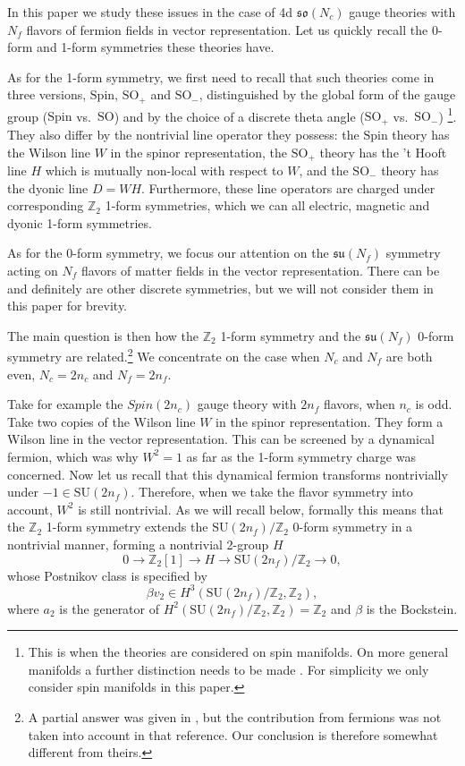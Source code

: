 \documentclass[12pt]{article}
\numberwithin{equation}{section}
\def\bZ{\mathbb{Z}}
\def\SU{\mathrm{SU}}
\def\SO{\mathrm{SO}}
\def\su{\mathfrak{su}}
\def\so{\mathfrak{so}}
\def\Spin{\mathrm{Spin}}
\begin{document}
In this paper we study these issues in the case of 4d $\so(N_c)$ gauge theories with 
$N_f$ flavors of fermion fields in vector representation.
Let us quickly recall the 0-form and 1-form symmetries these theories have.

As for the 1-form symmetry, we first need to recall that 
such theories come in three versions, $\Spin$, $\SO_+$ and $\SO_-$,
distinguished by the global form of the gauge group ($\Spin$ vs.~$\SO$)
and by the choice of a discrete theta angle ($\SO_+$ vs.~$\SO_-$) \cite{Aharony:2013hda}\footnote{%
This is when the theories are considered on spin manifolds.
On more general manifolds a further distinction needs to be made \cite{Ang:2019txy}.
For simplicity we only consider spin manifolds in this paper.
}.
They also differ by the nontrivial line operator they possess: 
the $\Spin$ theory has the Wilson line $W$ in the spinor representation,
the $\SO_+$ theory has the 't Hooft line $H$ which is mutually non-local with respect to $W$,
and the $\SO_-$ theory has the dyonic line $D=WH$. 
Furthermore, these line operators are charged under corresponding $\bZ_2$ 1-form symmetries,
which we can all electric, magnetic and dyonic 1-form symmetries.

As for the 0-form symmetry, 
we focus our attention on the $\su(N_f)$ symmetry acting on $N_f$ flavors of matter fields 
in the vector representation.
There can be and definitely are other discrete symmetries, but we will not consider them in this paper for brevity.

The main question is then how the $\bZ_2$ 1-form symmetry and the $\su(N_f)$ 0-form symmetry are related.\footnote{%
A partial answer was given in \cite{Hsin:2020nts}, but the contribution from fermions was not taken into account in that reference.
Our conclusion is therefore somewhat different from theirs.
}
We concentrate on the case when $N_c$ and $N_f$ are both even, $N_c=2n_c$ and $N_f=2n_f$.

Take for example the $Spin(2n_c)$ gauge theory with $2n_f$ flavors,
when $n_c$ is odd.
Take two copies of  the Wilson line $W$ in the spinor representation. 
They form a Wilson line in the vector representation.
This can be screened by a dynamical fermion, which was why $W^2=1$ 
as far as the 1-form symmetry charge was concerned.
Now let us recall that this dynamical fermion transforms nontrivially under $-1\in \SU(2n_f)$.
Therefore, when we take the flavor symmetry into account, $W^2$ is still nontrivial.
As we will recall below,  formally this means that the $\bZ_2$ 1-form symmetry extends the $\SU(2n_f)/\bZ_2$ 0-form symmetry in a nontrivial manner, forming a nontrivial 2-group  $H$\begin{equation}
0\to \bZ_2[1] \to H\to \SU(2n_f)/\bZ_2\to 0,\label{2-group}
\end{equation}
whose Postnikov class is specified by \begin{equation}
\beta v_2 \in H^3(\SU(2n_f)/\bZ_2,\bZ_2),\label{postnikov}
\end{equation}
where $a_2$ is the generator of $H^2(\SU(2n_f)/\bZ_2,\bZ_2)=\bZ_2$ and $\beta$ is the Bockstein.
\end{document}
